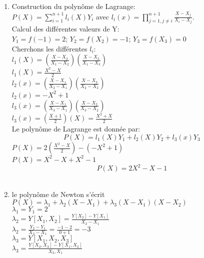 \documentclass[a4paper,12pt]{article}
\begin{document}
\begin{enumerate}
\item Construction du polynôme de Lagrange:\\
$P(X)= \displaystyle\sum_{i=1}^{n+1}l_{i}(X)Y_{i}$ avec ${l_{i}}(x)=\displaystyle\prod_{j=1,j\neq i}^{n+1} \frac{X-X_{j}}{X_{i}-X_{j}}$.\\

Calcul des différentes valeurs de Y:\\
$Y_{1}=f(-1)=2$; $Y_{2}=f(X_{2})=-1$; $Y_{3}=f(X_{3})=0$ \\

Cherchons les différentes $l_{i}$:\\
$l_{1}(X)=(\frac{X-X_{2}}{X_{1}-X_{2}})(\frac{X-X_{3}}{X_{1}-X_{3}})$\\
$l_{1}(X)=\frac{X^{2}-X}{2}$ \\ 

$l_{2}(x)=(\frac{X-X_{1}}{X_{2}-X_{1}})(\frac{X-X_{3}}{X_{2}-X_{3}})$\\
$l_{2}(x)= -X^{2}+1$ \\

$l_{3}(x)=(\frac{X-X_{1}}{X_{3}-X_{1}})(\frac{X-X_{2}}{X_{3}-X_{2}})$\\
$l_{3}(x)= (\frac{X+1}{2})(X)=\frac{X^{2}+X}{2}$ \\

Le polynôme de Lagrange est donnée par:\\

\[P(X)=l_{1}(X)Y_{1}+l_{2}(X)Y_{2}+l_{3}(x)Y_{3}\]
$P(X)=2(\frac{X^{2}-X}{2})-(-X^{2}+1)$ \\
$P(X)= X^{2}-X+X^{2}-1 $
  \[\boxed{P(X)=2X^{2}-X-1}\] \\

\item  le polynôme de Newton s'écrit \\ $P(X)=\lambda_{1}+\lambda_{2}(X-X_{1})+\lambda_{3}(X-X_{1})(X-X_{2})$ \\
 
$\lambda_{1}=Y_{1}=2$\\

$\lambda_{2}=Y[X_{1},X_{2}]=\frac{Y[X_{2}]-Y[X_{1}]}{X_{2}-X_{1}}$\\
$\lambda_{2}=\frac{Y_{2}-Y_{1}}{X_{2}-X_{1}}=\frac{-1-2}{0+1}=-3$ \\

$\lambda_{3}=Y[X_{1},X_{2},X_{3}]$\\

$\lambda_{3}=\frac{Y[X_{2},X_{3}]-Y[X_{1},X_{2}]}{X_{3},X_{1}}$\\
 

\end{enumerate}
\end{document}
